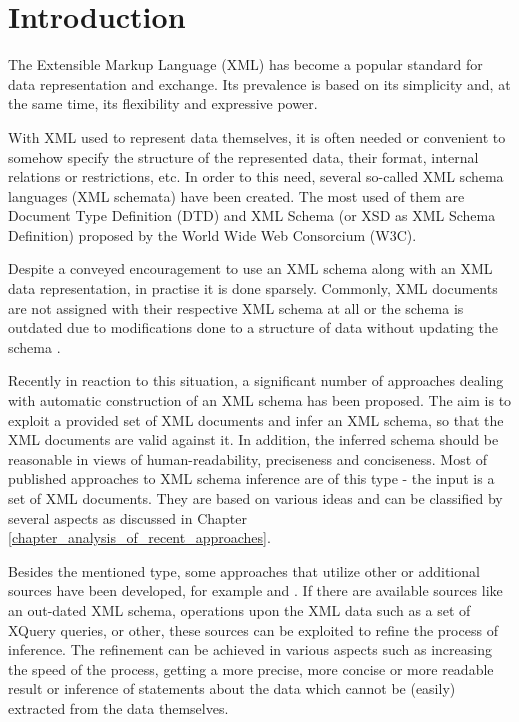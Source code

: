 \chapter{Introduction}
The Extensible Markup Language (XML) \cite{Bray:08:EML} has become a popular standard for data representation and exchange. Its prevalence is based on its simplicity and, at the same time, its flexibility and expressive power.

With XML used to represent data themselves, it is often needed or convenient to somehow specify the structure of the represented data, their format, internal relations or restrictions, etc. In order to this need, several so-called XML schema languages (XML schemata) have been created. The most used of them are Document Type Definition (DTD) \cite{Bray:08:EML} and XML Schema (or XSD as XML Schema Definition) \cite{Walmsley:04:XSP, Thompson:04:XSP, Malhotra:04:XSP} proposed by the World Wide Web Consorcium (W3C).

Despite a conveyed encouragement to use an XML schema along with an XML data representation, in practise it is done sparsely. Commonly, XML documents are not assigned with their respective XML schema at all or the schema is outdated due to modifications done to a structure of data without updating the schema \cite{Mlynkova:2008:AAX:1494650.1495496}.

Recently in reaction to this situation, a significant number of approaches dealing with automatic construction of an XML schema has been proposed. The aim is to exploit a provided set of XML documents and infer an XML schema, so that the XML documents are valid against it. In addition, the inferred schema should be reasonable in views of human-readability, preciseness and conciseness. Most of published approaches to XML schema inference are of this type - the input is a set of XML documents. They are based on various ideas and can be classified by several aspects as discussed in Chapter \ref{chapter_analysis_of_recent_approaches}.

Besides the mentioned type, some approaches that utilize other or additional sources have been developed, for example \cite{Mlynkova:2009:IXS:1862681.1862693} and \cite{thesis_klempa}. If there are available sources like an out-dated XML schema, operations upon the XML data such as a set of XQuery \cite{w3c_xquery} queries, or other, these sources can be exploited to refine the process of inference. The refinement can be achieved in various aspects such as increasing the speed of the process, getting a more precise, more concise or more readable result or inference of statements about the data which cannot be (easily) extracted from the data themselves.

